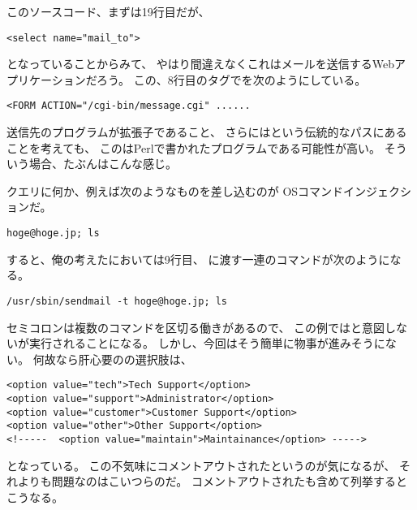 

このソースコード、まずは19行目だが、

\begin{lstlisting}[style=html, firstnumber=19]
<select name="mail_to">
\end{lstlisting}

となっていることからみて、
やはり間違えなくこれはメールを送信するWebアプリケーションだろう。
この、8行目のタグでを次のようにしている。

\begin{lstlisting}[style=html, firstnumber=8]
<FORM ACTION="/cgi-bin/message.cgi" ......
\end{lstlisting}

送信先のプログラムが拡張子であること、
さらにはという伝統的なパスにあることを考えても、
このはPerlで書かれたプログラムである可能性が高い。
そういう場合、たぶんはこんな感じ。



クエリに何か、例えば次のようなものを差し込むのが
OSコマンドインジェクションだ。

\begin{lstlisting}
hoge@hoge.jp; ls
\end{lstlisting}

すると、俺の考えたにおいては9行目、
に渡す一連のコマンドが次のようになる。

\begin{lstlisting}
/usr/sbin/sendmail -t hoge@hoge.jp; ls
\end{lstlisting}

セミコロンは複数のコマンドを区切る働きがあるので、
この例ではと意図しないが実行されることになる。
しかし、今回はそう簡単に物事が進みそうにない。
何故なら肝心要のの選択肢は、

\begin{lstlisting}[style=html, firstnumber=20]
<option value="tech">Tech Support</option>
<option value="support">Administrator</option>
<option value="customer">Customer Support</option>
<option value="other">Other Support</option>
<!-----  <option value="maintain">Maintainance</option> ----->
\end{lstlisting}

となっている。
この不気味にコメントアウトされたというのが気になるが、
それよりも問題なのはこいつらのだ。
コメントアウトされたも含めて列挙するとこうなる。

